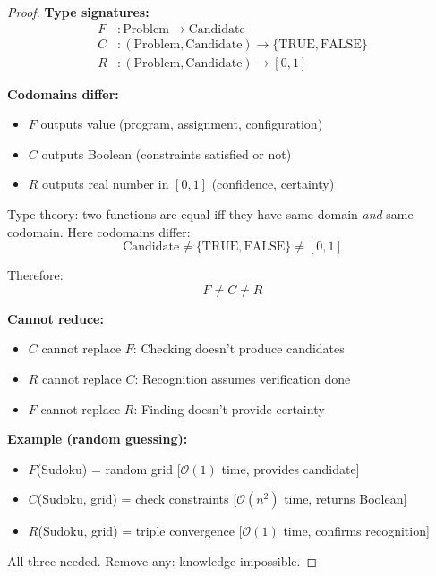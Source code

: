 \documentclass[twocolumn,10pt]{revtex4-2}
\theoremstyle{definition}
\theoremstyle{remark}
\newcommand{\bigO}{\mathcal{O}}
\begin{document}
\begin{proof}
\textbf{Type signatures:}
\begin{align}
F &: \text{Problem} \to \text{Candidate} \\
C &: (\text{Problem}, \text{Candidate}) \to \{\text{TRUE}, \text{FALSE}\} \\
R &: (\text{Problem}, \text{Candidate}) \to [0,1]
\end{align}

\textbf{Codomains differ:}
\begin{itemize}
\item $F$ outputs value (program, assignment, configuration)
\item $C$ outputs Boolean (constraints satisfied or not)
\item $R$ outputs real number in $[0,1]$ (confidence, certainty)
\end{itemize}

Type theory: two functions are equal iff they have same domain \textit{and} same codomain. Here codomains differ:
\begin{equation}
\text{Candidate} \neq \{\text{TRUE}, \text{FALSE}\} \neq [0,1]
\end{equation}

Therefore:
\begin{equation}
F \neq C \neq R
\end{equation}

\textbf{Cannot reduce:}
\begin{itemize}
\item $C$ cannot replace $F$: Checking doesn't produce candidates
\item $R$ cannot replace $C$: Recognition assumes verification done
\item $F$ cannot replace $R$: Finding doesn't provide certainty
\end{itemize}

\textbf{Example (random guessing):}
\begin{itemize}
\item $F$(Sudoku) = random grid [$\bigO(1)$ time, provides candidate]
\item $C$(Sudoku, grid) = check constraints [$\bigO(n^2)$ time, returns Boolean]
\item $R$(Sudoku, grid) = triple convergence [$\bigO(1)$ time, confirms recognition]
\end{itemize}

All three needed. Remove any: knowledge impossible.
\end{proof}
\end{document}
